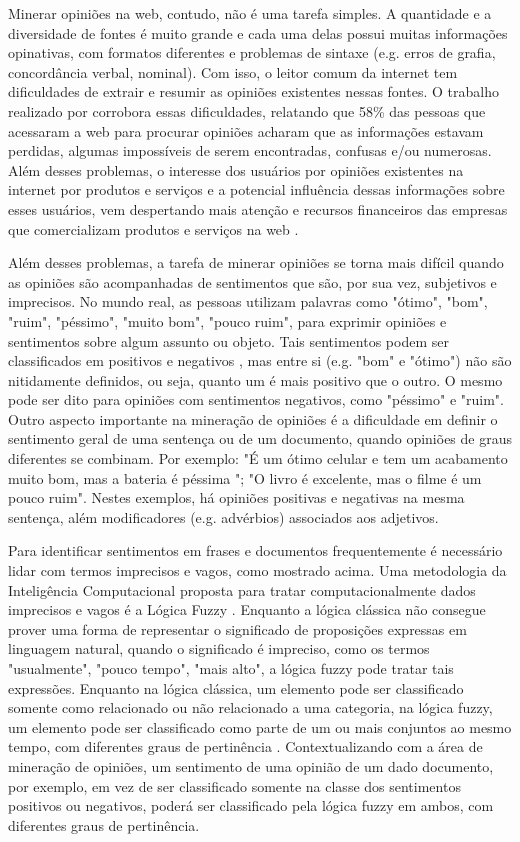 \documentclass[template.tex]{subfiles}
\begin{document}
Minerar opiniões na web, contudo, não é uma tarefa simples. A quantidade e a diversidade de fontes é muito grande \cite{kim2006forrester} e cada uma delas possui muitas informações opinativas, com formatos diferentes e problemas de sintaxe (e.g. erros de grafia, concordância verbal, nominal). Com isso, o leitor comum da internet tem dificuldades de extrair e resumir as opiniões existentes nessas fontes. O trabalho realizado por \cite{horrigan2008online} corrobora essas dificuldades, relatando que 58\% das pessoas que acessaram a web para procurar opiniões acharam que as informações estavam perdidas, algumas impossíveis de serem encontradas, confusas e/ou numerosas. Além desses problemas, o interesse dos usuários por opiniões existentes na internet por produtos e serviços e a potencial influência dessas informações sobre esses usuários, vem despertando mais atenção e recursos financeiros das empresas que comercializam produtos e serviços na web \cite{horrigan2008online}. 

Além desses problemas, a tarefa de minerar opiniões se torna mais difícil quando as opiniões são acompanhadas de sentimentos que são, por sua vez, subjetivos e imprecisos. No mundo real, as pessoas utilizam palavras como "ótimo", "bom", "ruim", "péssimo", "muito bom", "pouco ruim", para exprimir opiniões e sentimentos sobre algum assunto ou objeto. Tais sentimentos podem ser classificados em positivos e negativos \cite{bing:2012, pang:2008, pang2002thumbs, turney2002thumbs, Hu:2004}, mas entre si (e.g. "bom" e "ótimo") não são nitidamente definidos, ou seja, quanto um é mais positivo que o outro. O mesmo pode ser dito para opiniões com sentimentos negativos, como "péssimo" e "ruim". Outro aspecto importante na mineração de opiniões é a dificuldade em definir o sentimento geral de uma sentença ou de um documento, quando opiniões de graus diferentes se combinam. Por exemplo: "É um ótimo celular e tem um acabamento muito bom, mas a bateria é péssima "; "O livro é excelente, mas o filme é um pouco ruim". Nestes exemplos, há opiniões positivas e negativas na mesma sentença, além modificadores (e.g. advérbios) associados aos adjetivos.

Para identificar sentimentos em frases e documentos frequentemente é necessário lidar com termos imprecisos e vagos, como mostrado acima. Uma metodologia da Inteligência Computacional proposta para tratar computacionalmente dados imprecisos e vagos é a Lógica Fuzzy \cite{zadeh:1988}. Enquanto a lógica clássica não consegue prover uma forma de representar o significado de proposições expressas em linguagem natural, quando o significado é impreciso, como os termos "usualmente", "pouco tempo", "mais alto", a lógica fuzzy pode tratar tais expressões. Enquanto na lógica clássica, um elemento pode ser classificado somente como relacionado ou não relacionado a uma categoria, na lógica fuzzy, um elemento pode ser classificado como parte de um ou mais conjuntos ao mesmo tempo, com diferentes graus de pertinência  \cite{zadeh:1988}. Contextualizando com a área de mineração de opiniões, um sentimento de uma opinião de um dado documento, por exemplo, em vez de ser classificado somente na classe dos sentimentos positivos ou negativos, poderá ser classificado pela lógica fuzzy em ambos, com diferentes graus de pertinência.
\end{document}
